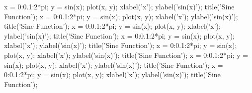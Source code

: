 \documentclass[UTF8]{report}
\theoremstyle{MyLineTheoremStyle} %
\theoremstyle{MyBlockTheoremStyle} %
\theoremstyle{MySubsubsectionStyle} %
\begin{document}
\begin{matlablisting}
x = 0:0.1:2*pi;
y = sin(x);
plot(x, y);
xlabel('x');
ylabel('sin(x)');
title('Sine Function');
x = 0:0.1:2*pi;
y = sin(x);
plot(x, y);
xlabel('x');
ylabel('sin(x)');
title('Sine Function');
x = 0:0.1:2*pi;
y = sin(x);
plot(x, y);
xlabel('x');
ylabel('sin(x)');
title('Sine Function');
x = 0:0.1:2*pi;
y = sin(x);
plot(x, y);
xlabel('x');
ylabel('sin(x)');
title('Sine Function');
x = 0:0.1:2*pi;
y = sin(x);
plot(x, y);
xlabel('x');
ylabel('sin(x)');
title('Sine Function');
x = 0:0.1:2*pi;
y = sin(x);
plot(x, y);
xlabel('x');
ylabel('sin(x)');
title('Sine Function');
x = 0:0.1:2*pi;
y = sin(x);
plot(x, y);
xlabel('x');
ylabel('sin(x)');
title('Sine Function');
\end{matlablisting}

\end{document}
